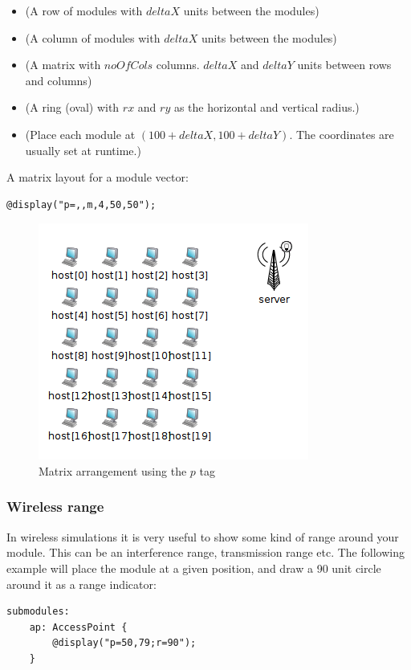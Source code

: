 \begin{itemize}
  \item {} (A row of modules with $deltaX$ units between the modules)
  \item {} (A column of modules with $deltaX$ units between the modules)
  \item {} (A matrix with $noOfCols$ columns.
            $deltaX$ and $deltaY$ units between rows and columns)
  \item {} (A ring (oval) with $rx$ and $ry$ as the horizontal and vertical radius.)
  \item {} (Place each module at $(100+deltaX, 100+deltaY)$.
            The coordinates are usually set at runtime.)
\end{itemize}

A matrix layout for a module vector:
\begin{verbatim}
@display("p=,,m,4,50,50");
\end{verbatim}

\begin{figure}[htbp]
  \begin{center}
    \includegraphics{figures/graphics-ptag}
    \caption{Matrix arrangement using the $p$ tag}
    \label{fig:graphics-ptag}
  \end{center}
\end{figure}

\subsubsection{Wireless range}
In wireless simulations it is very useful to show some kind of range
around your module. This can be an interference range, transmission range
etc. The following example will place the module at a given position,
and draw a 90 unit circle around it as a range indicator:
\begin{verbatim}
submodules:
    ap: AccessPoint {
        @display("p=50,79;r=90");
    }
\end{verbatim}

